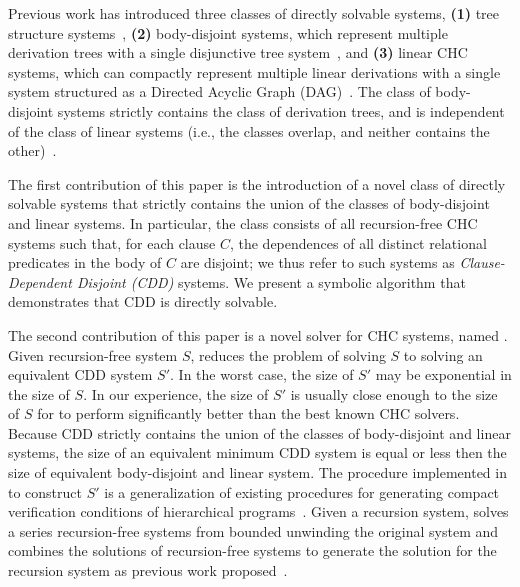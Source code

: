 Previous work has introduced three classes of directly solvable systems,
\textbf{(1)} tree structure systems~\cite{heizmann10,bjorner13,mcmillan14}, %
\textbf{(2)} body-disjoint systems, which represent multiple
derivation trees with a single disjunctive tree
system~\cite{rummer13a,rummer13b}, and
\textbf{(3)} linear CHC systems, which can compactly represent
multiple linear derivations with a single system structured as a
Directed Acyclic Graph (DAG)~\cite{albarghouthi12a}.
%
The class of body-disjoint systems strictly contains the class of
derivation trees, and is independent of the class of linear systems
(i.e., the classes overlap, and neither contains the
other)~\cite{rummer13a,rummer13b}.


The first contribution of this paper is the introduction of a novel
class of directly solvable systems that strictly
contains the union of the classes of body-disjoint and linear systems.
%
In particular, the class consists of all recursion-free CHC systems such that, 
for each clause $C$, the dependences of all distinct relational
predicates in the body of $C$ are disjoint;
%
we thus refer to such systems as \emph{Clause-Dependent Disjoint
  (CDD)} systems.
%
We present a symbolic algorithm that demonstrates that CDD is directly solvable.
%

The second contribution of this paper is a novel solver for
CHC systems, named \sys.
%
Given recursion-free system $S$, \sys reduces the problem
of solving $S$ to solving an equivalent CDD system
$S'$.
%
In the worst case, the size of $S'$ may be exponential in the size of
$S$.
%
In our experience, the size of $S'$ is usually close enough
to the size of $S$ for \sys to perform significantly better
than the best known CHC solvers.
%
Because CDD strictly contains the union of the classes 
of body-disjoint and linear systems, the size of an equivalent minimum 
CDD system is equal or less then the size of equivalent body-disjoint and
linear system.
%
The procedure implemented in \sys to construct $S'$ is a
generalization of existing procedures for generating compact
verification conditions of hierarchical
programs~\cite{flanagan01,lal-qadeer15}.
%
Given a recursion system, \sys solves a series recursion-free systems 
from bounded unwinding the original system and combines the solutions
of recursion-free systems to generate the solution for the recursion system
as previous work proposed~\cite{rummer13b}.
%

